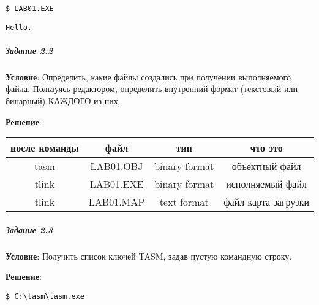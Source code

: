 \begin{lstlisting}[language=Terminal]
$ LAB01.EXE
\end{lstlisting}

\begin{lstlisting}[language=Out]
Hello.
\end{lstlisting}



\subparagraph{Задание 2.2}

\textbf{Условие}: Определить, какие файлы создались при получении выполняемого файла. Пользуясь редактором, определить внутренний формат (текстовый или бинарный) КАЖДОГО из них.

\textbf{Решение}: 

\begin{table}[!ht]
   \begin{center}
      \begin{tabular}{|c|c|c|c|}
         \hline
         после команды  & файл      & тип             & что это               \\ \hline
         \hline
         tasm           & LAB01.OBJ & binary format   & объектный файл        \\ \hline
         tlink          & LAB01.EXE & binary format   & исполняемый файл      \\ \hline
         tlink          & LAB01.MAP & text format     & файл карта загрузки   \\ \hline
      \end{tabular}
   \end{center}
\end{table}



\subparagraph{Задание 2.3}

\textbf{Условие}: Получить список ключей TASM, задав пустую командную строку.

\textbf{Решение}: 

\begin{lstlisting}[language=Terminal]
$ C:\tasm\tasm.exe
\end{lstlisting}

